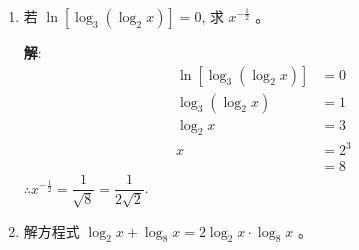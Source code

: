 \documentclass{report}
\newcommand{\sol}{\vspace{0.2cm}\textbf{解}:}
\begin{document}
\begin{multicols*}{2}
\begin{enumerate}[leftmargin=*]
              \sol{}
              \begin{align*}
                  x^{\log x - 1}           & = 100                \\
                  \log x^{\log x - 1}      & = \log 100           \\
                  (\log x)(\log x - 1)     & = 2                  \\
                  (\log x)^2 - \log x - 2  & = 0                  \\
                  (\log x - 2)(\log x + 1) & = 0                  \\
                  \log x                   & = 2, -1              \\
                  x                        & = 100, \dfrac{1}{10}
              \end{align*}
              $\therefore x$ 的解集为 $\left\{100, 0.1\right\}$.

        \item 若 $\ln \left[\log _3\left(\log _2 x\right)\right]=0$, 求 $x^{-\frac{1}{2}}$ 。

              \sol{}
              \begin{align*}
                  \ln \left[\log _3\left(\log _2 x\right)\right] & = 0   \\
                  \log _3\left(\log _2 x\right)                  & = 1   \\
                  \log _2 x                                      & = 3   \\
                  x                                              & = 2^3 \\
                                                                 & = 8
              \end{align*}
              $\therefore x^{-\frac{1}{2}} = \dfrac{1}{\sqrt{8}} = \dfrac{1}{2\sqrt{2}}$.

              \newpage
        \item 解方程式 $\log _2 x+\log _8 x=2 \log _2 x \cdot \log _8 x$ 。


\end{enumerate}
\end{multicols*}
\end{document}
